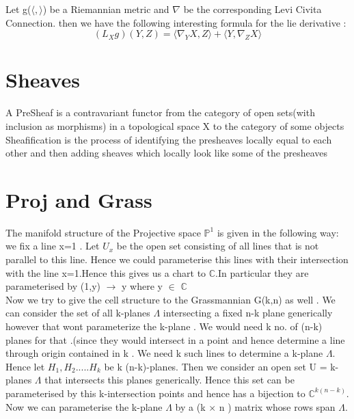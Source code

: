 \documentclass[psamsfonts]{amsart}
\theoremstyle{definition}
\theoremstyle{remark}
\numberwithin{equation}{section}
\begin{document}
Let g($\langle , \rangle$) be a Riemannian metric and $\nabla$ be the corresponding Levi Civita Connection. then we have the following interesting formula for the lie derivative :
\[  (L_{X}g)(Y,Z) = \langle \nabla_{Y}X ,Z \rangle  +\langle Y ,\nabla_{Z}X \rangle                                        \]

\paragraph{}
\paragraph{}





\section{Sheaves}


A PreSheaf is a contravariant functor from the category of open sets(with inclusion as morphisms) in a topological space X to the category of some objects \\
Sheafification is the process of identifying the presheaves locally equal to each other and then adding sheaves which locally look like some of the presheaves
\section{Proj and Grass}

The manifold structure of the Projective space $\mathbb{P}^{1}$ is given in the following way: we fix a line x=1 . Let $U_{x}$ be the open set consisting of all lines that is not parallel to this line. Hence we could parameterise this lines with their intersection with the line x=1.Hence this gives us a chart to $\mathbb{C}$.In particular they are parameterised by (1,y) $\to$ y where y $\in$ $\mathbb{C}$ \\
Now we try to give the cell structure to the Grassmannian G(k,n) as well . We can consider the set of all k-planes $\Lambda$ intersecting a fixed n-k plane generically however that wont parameterize the k-plane . We would need k no. of (n-k) planes for that .(since they would intersect in a point and hence determine a line through origin contained in k . We need k such lines to determine a k-plane $\Lambda$. Hence let $H_{1},H_{2} ..... H_{k}$ be k (n-k)-planes. Then we consider an open set U = k-planes $\Lambda$ that intersects this planes generically. Hence this set can be parameterised by this k-intersection points and hence has a bijection to $\mathbb{C}^{k(n-k)}$.\\
Now we can parameterise the k-plane $\Lambda$ by a (k $\times$ n ) matrix whose rows span $\Lambda$. 
 
\end{document}
